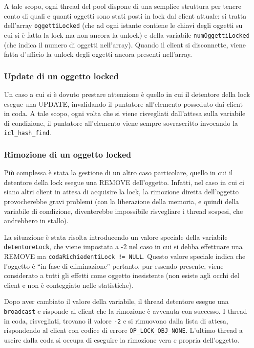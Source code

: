\documentclass[a4paper,12pt]{article}
\begin{document}
A tale scopo, ogni thread del pool dispone di una semplice struttura per tenere conto di quali e quanti oggetti sono stati posti in lock dal client attuale: si tratta dell'array \texttt{oggettiLocked} (che ad ogni istante contiene le chiavi degli oggetti su cui si è fatta la lock ma non ancora la unlock) e della variabile \texttt{numOggettiLocked} (che indica il numero di oggetti nell'array). Quando il client si disconnette, viene fatta d'ufficio la unlock degli oggetti ancora presenti nell'array.

\subsubsection*{ Update di un oggetto locked }

Un caso a cui si è dovuto prestare attenzione è quello in cui il detentore della lock esegue una UPDATE, invalidando il puntatore all'elemento posseduto dai client in coda. A tale scopo, ogni volta che si viene risvegliati dall'attesa sulla variabile di condizione, il puntatore all'elemento viene sempre sovrascritto invocando la \texttt{icl\_hash\_find}.

\subsubsection*{ Rimozione di un oggetto locked }

Più complessa è stata la gestione di un altro caso particolare, quello in cui il detentore della lock esegue una REMOVE dell'oggetto. Infatti, nel caso in cui ci siano altri client in attesa di acquisire la lock, la rimozione diretta dell'oggetto provocherebbe gravi problemi (con la liberazione della memoria, e quindi della variabile di condizione, diventerebbe impossibile risvegliare i thread sospesi, che andrebbero in stallo).

La situazione è stata risolta introducendo un valore speciale della variabile \texttt{detentoreLock}, che viene impostata a -2 nel caso in cui si debba effettuare una REMOVE ma \texttt{codaRichiedentiLock != NULL}. Questo valore speciale indica che l'oggetto è ``in fase di eliminazione'' pertanto, pur essendo presente, viene considerato a tutti gli effetti come oggetto inesistente (non esiste agli occhi del client e non è conteggiato nelle statistiche).

Dopo aver cambiato il valore della variabile, il thread detentore esegue una \texttt{broadcast} e risponde al client che la rimozione è avvenuta con successo. I thread in coda, risvegliati, trovano il valore \texttt{-2} e si rimuovono dalla lista di attesa, rispondendo al client con codice di errore \texttt{OP\_LOCK\_OBJ\_NONE}. L'ultimo thread a uscire dalla coda si occupa di eseguire la rimozione vera e propria dell'oggetto.
\end{document}
